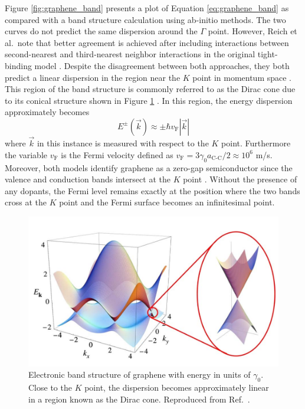 Figure \ref{fig:graphene_band} presents a plot of Equation \eqref{eq:graphene_band} as compared with a band structure calculation using ab-initio methods. The two curves do not predict the same dispersion around the $\Gamma$ point. However, Reich et al.\ note that better agreement is achieved after including interactions between second-nearest and third-nearest neighbor interactions in the original tight-binding model \cite{reich2002tight}. Despite the disagreement between both approaches, they both predict a linear dispersion in the region near the $K$ point in momentum space \cite{charlier2007electronic}. This region of the band structure is commonly referred to as the Dirac cone due to its conical structure shown in Figure \ref{fig:dirac_cone} \cite{charlier2007electronic}. In this region, the energy dispersion approximately becomes
\begin{equation}
	\displaystyle E^{\pm}(\vec{k}) \approx \pm \hbar v_\text{F}|\vec{k}|
\end{equation}
where $\vec{k}$ in this instance is measured with respect to the $K$ point. Furthermore the variable $v_\text{F}$ is the Fermi velocity defined as $v_\text{F} = 3 \gamma_0 a_\text{C-C}/2 \approx 10^6$ m/s. Moreover, both models identify graphene as a zero-gap semiconductor since the valence and conduction bands intersect at the $K$ point \cite{charlier2007electronic}. Without the presence of any dopants, the Fermi level remains exactly at the position where the two bands cross at the $K$ point and the Fermi surface becomes an infinitesimal point.

\begin{figure}[ht]
	\centering
	\includegraphics[scale=0.4]{images/chapter_optical_props/dirac_cone}
	\caption{Electronic band structure of graphene with energy in units of $\gamma_0$. Close to the $K$ point, the dispersion becomes approximately linear in a region known as the Dirac cone. Reproduced from Ref.\ \cite{neto2009electronic}.}
	\label{fig:dirac_cone}
\end{figure}


